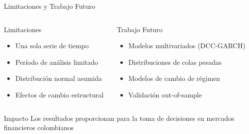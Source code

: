 \begin{frame}{Limitaciones y Trabajo Futuro}
    \begin{columns}
        \begin{column}{0.5\textwidth}
            \begin{block}{Limitaciones}
                \begin{itemize}
                    \item Una sola serie de tiempo
                    \item Período de análisis limitado
                    \item Distribución normal asumida
                    \item Efectos de cambio estructural
                \end{itemize}
            \end{block}
        \end{column}
        
        \begin{column}{0.5\textwidth}
            \begin{block}{Trabajo Futuro}
                \begin{itemize}
                    \item Modelos multivariados (DCC-GARCH)
                    \item Distribuciones de colas pesadas
                    \item Modelos de cambio de régimen
                    \item Validación out-of-sample
                \end{itemize}
            \end{block}
        \end{column}
    \end{columns}
    
    \vspace{1em}
    
    \begin{alertblock}{Impacto}
        Los resultados proporcionan  para la toma de decisiones en mercados financieros colombianos
    \end{alertblock}
\end{frame}

